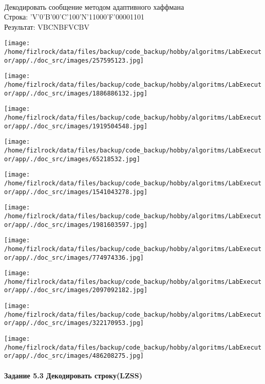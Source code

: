 \documentclass[a4paper, 12pt]{article}
\begin{document}
\\ 

Декодировать сообщение методом адаптивного хаффмана \\
Строка: 
'V'0'B'00'C'100'N'11000'F'00001101\\
Результат: VBCNBFVCBV

\texttt{[image: /home/fizlrock/data/files/backup/code\_backup/hobby/algoritms/LabExecutor/app/./doc\_src/images/257595123.jpg]}

\texttt{[image: /home/fizlrock/data/files/backup/code\_backup/hobby/algoritms/LabExecutor/app/./doc\_src/images/1886886132.jpg]}

\texttt{[image: /home/fizlrock/data/files/backup/code\_backup/hobby/algoritms/LabExecutor/app/./doc\_src/images/1919504548.jpg]}

\texttt{[image: /home/fizlrock/data/files/backup/code\_backup/hobby/algoritms/LabExecutor/app/./doc\_src/images/65218532.jpg]}

\texttt{[image: /home/fizlrock/data/files/backup/code\_backup/hobby/algoritms/LabExecutor/app/./doc\_src/images/1541043278.jpg]}

\texttt{[image: /home/fizlrock/data/files/backup/code\_backup/hobby/algoritms/LabExecutor/app/./doc\_src/images/1981603597.jpg]}

\texttt{[image: /home/fizlrock/data/files/backup/code\_backup/hobby/algoritms/LabExecutor/app/./doc\_src/images/774974336.jpg]}

\texttt{[image: /home/fizlrock/data/files/backup/code\_backup/hobby/algoritms/LabExecutor/app/./doc\_src/images/2097092182.jpg]}

\texttt{[image: /home/fizlrock/data/files/backup/code\_backup/hobby/algoritms/LabExecutor/app/./doc\_src/images/322170953.jpg]}

\texttt{[image: /home/fizlrock/data/files/backup/code\_backup/hobby/algoritms/LabExecutor/app/./doc\_src/images/486208275.jpg]}
\pagebreak
\paragraph{Задание 5.3 Декодировать строку(LZSS)\\}
\end{document}
